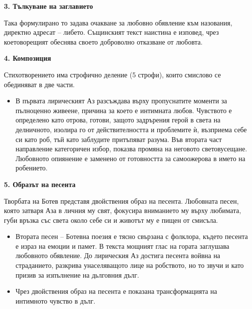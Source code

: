 \documentclass[12pt,a4paper]{article}
\begin{document}
\vspace{0.1cm}
\noindent
\textbf{3. Тълкуване на заглавието}
\vspace{0.1cm}

\indent Така формулирано то задава очакване за любовно обявление към назования, директно адресат – либето. Същинският текст наистина е изповед, чрез коетоворещият обеснява своето доброволно отказване от любовта.

\vspace{0.1cm}
\textbf{4. Композиция}
\vspace{0.1cm}

\indent Стихотворението има строфично деление (5 строфи), които смислово се обединяват в две части.

\vspace{0.1cm}
\begin{itemize}[leftmargin=*, noitemsep, topsep=2pt, parsep=0pt]
    \item В първата лирическият Аз разсъждава върху пропуснатите моменти за пълноценно живеене, причина за което е интимната любов. Чувството е определено като отрова, готови, защото задрърения герой в света на делничното, изолира го от действителността и проблемите ѝ, възприема себе си като роб, тъй като заблудите притъпяват разума. Във втората част направление категоричен избор, показва промяна на неговото световусещане. Любовното опиянение е заменено от готовността за самоожерова в името на робението.
\end{itemize}

\vspace{0.1cm}
\textbf{5. Образът на песента}
\vspace{0.1cm}

\indent Творбата на Ботев представя двойствения образ на песента. Любовната песен, която затваря Аза в личния му свят, фокусира вниманието му върху любимата, губи връзка със света около себе си и животът му е пищен от смисъла.

\vspace{0.1cm}
\begin{itemize}[leftmargin=*, noitemsep, topsep=2pt, parsep=0pt]
    \item Втората песен -- Ботевна поезия е тясно свързана с фолклора, където песента е израз на емоции и памет. В текста мощният глас на гората заглушава любовното обявление. До лирическия Аз достига песента войвна на страданието, разкрива унаселяващото лице на робството, но то звучи и като призив за изпълнение на дьлговния дълг.
    \vspace{0.1cm}
    \item Чрез двойствения образ на песента е показана трансформацията на интимното чувство в дълг.
\end{itemize}
\end{document}

